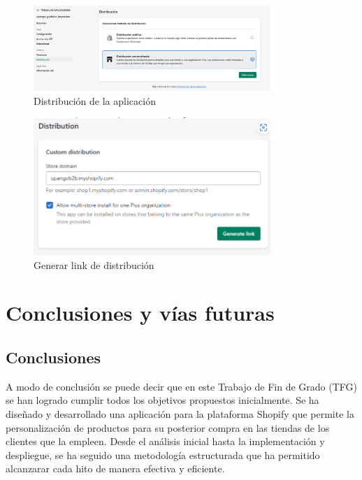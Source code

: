 \documentclass[12pt]{article}
\begin{document}
\begin{figure}[ht]
    \centering
    \includegraphics[width=0.8\textwidth]{imagenes/distribucionAppEnlace.png}
    \caption{\label{fig:DistributionAppPartners}Distribución de la aplicación}
    \vspace{\fill}
\end{figure}

\begin{figure}[ht]
    \centering
    \includegraphics[width=0.8\textwidth]{imagenes/generarLinkDistribution.png}
    \caption{\label{fig:generarLinkDistribution}Generar link de distribución}
    \vspace{\fill}
\end{figure}


\clearpage
\section{Conclusiones y vías futuras}

\subsection{Conclusiones}
A modo de conclusión se puede decir que en este Trabajo de Fin de Grado (TFG) se han logrado cumplir todos
los objetivos propuestos inicialmente. Se ha diseñado y desarrollado una aplicación para la plataforma Shopify que 
permite la personalización de productos para su posterior compra en las tiendas de los clientes que la empleen.
Desde el análisis inicial hasta la implementación y despliegue, se ha seguido una metodología estructurada que ha permitido
alcanzarar cada hito de manera efectiva y eficiente.
\end{document}
